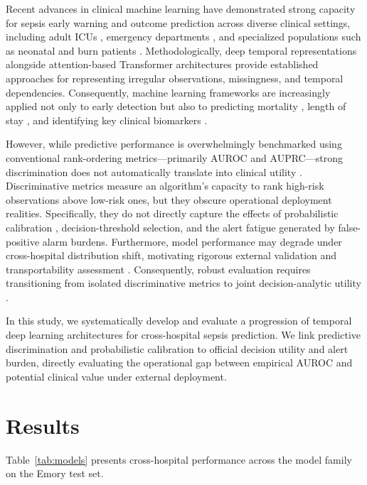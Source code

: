 \documentclass[11pt,a4paper]{article}
\begin{document}
Recent advances in clinical machine learning have demonstrated strong capacity for sepsis early warning and outcome prediction across diverse clinical settings, including adult ICUs \cite{ref:ibmed2026}, emergency departments \cite{ref:ajem2026}, and specialized populations such as neonatal \cite{ref:ibmed2025} and burn patients \cite{ref:burns2026}. Methodologically, deep temporal representations \cite{ref:che2018} alongside attention-based Transformer architectures \cite{ref:vaswani2017} provide established approaches for representing irregular observations, missingness, and temporal dependencies. Consequently, machine learning frameworks are increasingly applied not only to early detection \cite{ref:info2026} but also to predicting mortality \cite{ref:engmed2026, ref:smhl2025}, length of stay \cite{ref:shock2026}, and identifying key clinical biomarkers \cite{ref:ijmedinf2026}.

However, while predictive performance is overwhelmingly benchmarked using conventional rank-ordering metrics---primarily AUROC and AUPRC---strong discrimination does not automatically translate into clinical utility \cite{ref:jcrc2025}. Discriminative metrics measure an algorithm's capacity to rank high-risk observations above low-risk ones, but they obscure operational deployment realities. Specifically, they do not directly capture the effects of probabilistic calibration \cite{ref:guo2017}, decision-threshold selection, and the alert fatigue generated by false-positive alarm burdens. Furthermore, model performance may degrade under cross-hospital distribution shift, motivating rigorous external validation and transportability assessment \cite{ref:futoma2020}. Consequently, robust evaluation requires transitioning from isolated discriminative metrics to joint decision-analytic utility \cite{ref:vickers2006, ref:reyna2020}.

In this study, we systematically develop and evaluate a progression of temporal deep learning architectures for cross-hospital sepsis prediction. We link predictive discrimination and probabilistic calibration to official decision utility and alert burden, directly evaluating the operational gap between empirical AUROC and potential clinical value under external deployment.

\section*{Results}
Table~\ref{tab:models} presents cross-hospital performance across the model family on the Emory test set.
\end{document}
